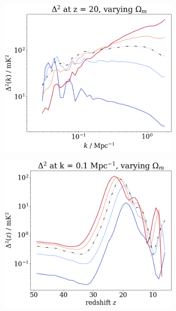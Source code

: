 \documentclass[floats,floatfix,showpacs,amssymb,prd,superscriptaddress,nofootinbib]{revtex4-2} %
\begin{document}
\begin{figure}[H]
\begin{subfigure}[b]{0.45\textwidth}
         \centering
         \includegraphics[width=\textwidth]{images/simulation_results/power_spectrum_fixed_z_20_Om.png}
         \label{fig:power_spectrum_fixed_z_20_Om}
     \end{subfigure}
     \hfill
     \begin{subfigure}[b]{0.45\textwidth}
         \centering
         \includegraphics[width=\textwidth]{images/simulation_results/power_spectrum_fixed_k_0.1_Om.png}

\end{subfigure}
\end{figure}
\end{document}
